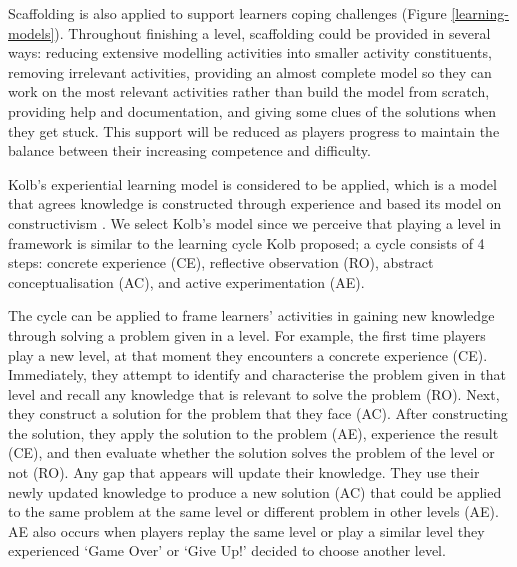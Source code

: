 \documentclass[12pt, a4paper]{report} \usepackage[titletoc]{appendix}
\begin{document}
\begin{appendices}
Scaffolding \cite{vygotsky1978mind, wood1976role} is also applied to support learners coping challenges (Figure \ref{learning-models}). Throughout finishing a level, scaffolding could be provided in several ways: reducing extensive modelling activities into smaller activity constituents, removing irrelevant activities, providing an almost complete model so they can work on the most relevant activities rather than build the model from scratch, providing help and documentation, and giving some clues of the solutions when they get stuck. This support will be reduced as players progress to maintain the balance between their increasing competence and difficulty.

Kolb's experiential learning model is considered to be applied, which is a model that agrees knowledge is constructed through experience and based its model on constructivism \cite{kolb2014experiential}. We select Kolb's model since we perceive that playing a level in framework is similar to the learning cycle Kolb proposed; a cycle consists of 4 steps: concrete experience (CE), reflective observation (RO), abstract conceptualisation (AC), and active experimentation (AE). 

The cycle can be applied to frame learners' activities in gaining new knowledge through solving a problem given in a level. For example, the first time players play a new level, at that moment they encounters a concrete experience (CE). Immediately, they attempt to identify and characterise the problem given in that level and recall any knowledge that is relevant to solve the problem (RO). Next, they construct a solution for the problem that they face (AC). After constructing the solution, they apply the solution to the problem (AE), experience the result (CE), and then evaluate whether the solution solves the problem of the level or not (RO). Any gap that appears will update their knowledge. They use their newly updated knowledge to produce a new solution (AC) that could be applied to the same problem at the same level or different problem in other levels (AE). AE also occurs when players replay the same level or play a similar level they experienced `Game Over' or `Give Up!' decided to choose another level.


\end{appendices}
\end{document}
